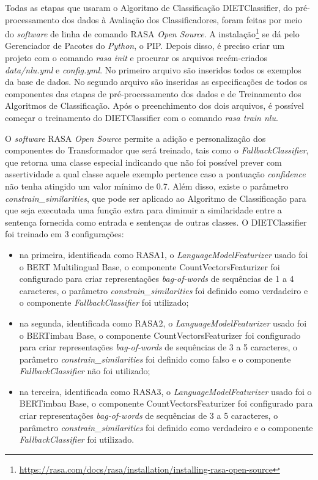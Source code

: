Todas as etapas que usaram o Algoritmo de Classificação DIETClassifier, do pré-processamento dos dados à Avaliação dos Classificadores, foram feitas por meio do \textit{software} de linha de comando RASA \textit{Open Source}. A instalação\footnote{\url{https://rasa.com/docs/rasa/installation/installing-rasa-open-source}} se dá pelo Gerenciador de Pacotes do \textit{Python}, o PIP. Depois disso, é preciso criar um projeto com o comando \textit{rasa init} e procurar os arquivos recém-criados \textit{data/nlu.yml} e \textit{config.yml}. No primeiro arquivo são inseridos todos os exemplos da base de dados. No segundo arquivo são inseridas as especificações de todos os componentes das etapas de pré-processamento dos dados e de Treinamento dos Algoritmos de Classificação. Após o preenchimento dos dois arquivos, é possível começar o treinamento do DIETClassifier com o comando \textit{rasa train nlu}.


O \textit{software} RASA \textit{Open Source} permite a adição e personalização dos componentes do Transformador que será treinado, tais como o \textit{FallbackClassifier}, que retorna uma classe especial indicando que não foi possível prever com assertividade a qual classe aquele exemplo pertence caso a pontuação \textit{confidence} não tenha atingido um valor mínimo de 0.7. Além disso, existe o parâmetro \textit{constrain\_similarities}, que pode ser aplicado ao Algoritmo de Classificação para que seja executada uma função extra para diminuir a similaridade entre a sentença fornecida como entrada e sentenças de outras classes. O DIETClassifier foi treinado em 3 configurações: 

\begin{itemize}
    \item na primeira, identificada como RASA1, o \textit{LanguageModelFeaturizer} usado foi o BERT Multilingual Base, o componente CountVectorsFeaturizer foi configurado para criar representações \textit{bag-of-words} de sequências de 1 a 4 caracteres, o parâmetro \textit{constrain\_similarities} foi definido como verdadeiro e o componente \textit{FallbackClassifier} foi utilizado;
    \item na segunda, identificada como RASA2, o \textit{LanguageModelFeaturizer} usado foi o BERTimbau Base, o componente CountVectorsFeaturizer foi configurado para criar representações \textit{bag-of-words} de sequências de 3 a 5 caracteres, o parâmetro \textit{constrain\_similarities} foi definido como falso e o componente \textit{FallbackClassifier} não foi utilizado;
    \item na terceira, identificada como RASA3, o \textit{LanguageModelFeaturizer} usado foi o BERTimbau Base, o componente CountVectorsFeaturizer foi configurado para criar representações \textit{bag-of-words} de sequências de 3 a 5 caracteres, o parâmetro \textit{constrain\_similarities} foi definido como verdadeiro e o componente \textit{FallbackClassifier} foi utilizado.
\end{itemize}

